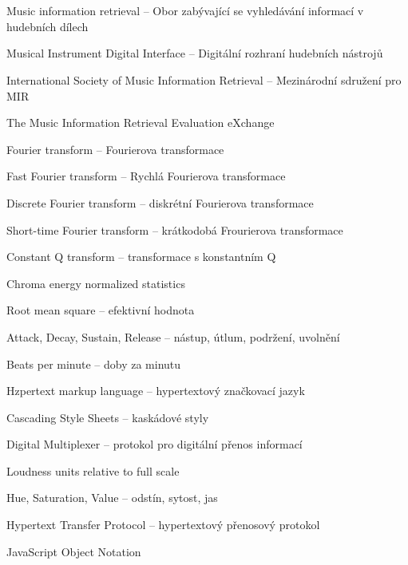 \cleardoublepage
\chapter*{\listofabbrevname}
{}

\begin{acronym}[KolikMista]
		{Music information retrieval -- Obor zabývající se vyhledávání informací v hudebních dílech}
	
		{Musical Instrument Digital Interface -- Digitální rozhraní hudebních nástrojů}

		{International Society of Music Information Retrieval -- Mezinárodní sdružení pro \acs*{MIR}}	

		{The Music Information Retrieval Evaluation eXchange}

		{Fourier transform -- Fourierova transformace}
		
		{Fast Fourier transform -- Rychlá Fourierova transformace}

		{Discrete Fourier transform -- diskrétní Fourierova transformace}

		{Short-time Fourier transform -- krátkodobá Frourierova transformace}

		{Constant Q transform -- transformace s konstantním Q}
	
		{Chroma energy normalized statistics}
	
		{Root mean square -- efektivní hodnota}

		{Attack, Decay, Sustain, Release -- nástup, útlum, podržení, uvolnění }

		{Beats per minute -- doby za minutu}

		{Hzpertext markup language --  hypertextový značkovací jazyk}

	{Cascading Style Sheets -- kaskádové styly}

		{Digital Multiplexer -- protokol pro digitální přenos informací}
	
		{Loudness units relative to full scale}
	
		{Hue, Saturation, Value -- odstín, sytost, jas}

		{Hypertext Transfer Protocol -- hypertextový přenosový protokol}

	{JavaScript Object Notation}
\end{acronym}
